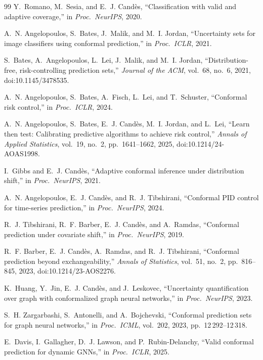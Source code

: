 \documentclass[journal,twoside]{IEEEtran}
\begin{document}
\begin{thebibliography}{99}
Y.~Romano, M.~Sesia, and E.~J. Cand\`{e}s,
``Classification with valid and adaptive coverage,''
in \emph{Proc.\ NeurIPS}, 2020.

A.~N. Angelopoulos, S.~Bates, J.~Malik, and M.~I. Jordan,
``Uncertainty sets for image classifiers using conformal prediction,''
in \emph{Proc.\ ICLR}, 2021.

S.~Bates, A.~Angelopoulos, L.~Lei, J.~Malik, and M.~I. Jordan,
``Distribution-free, risk-controlling prediction sets,''
\emph{Journal of the ACM}, vol.~68, no.~6, 2021, doi:10.1145/3478535.

A.~N. Angelopoulos, S.~Bates, A.~Fisch, L.~Lei, and T.~Schuster,
``Conformal risk control,''
in \emph{Proc.\ ICLR}, 2024.

A.~N. Angelopoulos, S.~Bates, E.~J. Cand\`{e}s, M.~I. Jordan, and L.~Lei,
``Learn then test: Calibrating predictive algorithms to achieve risk
control,''
\emph{Annals of Applied Statistics}, vol.~19, no.~2, pp.~1641--1662, 2025,
doi:10.1214/24-AOAS1998.

I.~Gibbs and E.~J. Cand\`{e}s,
``Adaptive conformal inference under distribution shift,''
in \emph{Proc.\ NeurIPS}, 2021.

A.~N. Angelopoulos, E.~J. Cand\`{e}s, and R.~J. Tibshirani,
``Conformal PID control for time-series prediction,''
in \emph{Proc.\ NeurIPS}, 2024.

R.~J. Tibshirani, R.~F. Barber, E.~J. Cand\`{e}s, and A.~Ramdas,
``Conformal prediction under covariate shift,''
in \emph{Proc.\ NeurIPS}, 2019.

R.~F. Barber, E.~J. Cand\`{e}s, A.~Ramdas, and R.~J. Tibshirani,
``Conformal prediction beyond exchangeability,''
\emph{Annals of Statistics}, vol.~51, no.~2, pp.~816--845, 2023,
doi:10.1214/23-AOS2276.

K.~Huang, Y.~Jin, E.~J. Cand\`{e}s, and J.~Leskovec,
``Uncertainty quantification over graph with conformalized graph neural
networks,''
in \emph{Proc.\ NeurIPS}, 2023.

S.~H. Zargarbashi, S.~Antonelli, and A.~Bojchevski,
``Conformal prediction sets for graph neural networks,''
in \emph{Proc.\ ICML}, vol.~202, 2023, pp.~12\,292--12\,318.

E.~Davis, I.~Gallagher, D.~J. Lawson, and P.~Rubin-Delanchy,
``Valid conformal prediction for dynamic GNNs,''
in \emph{Proc.\ ICLR}, 2025.


\end{thebibliography}
\end{document}
